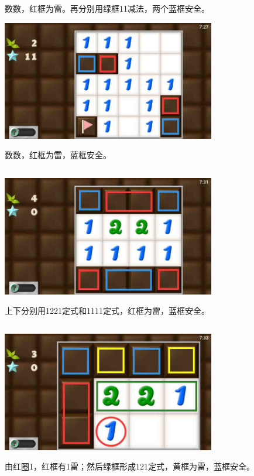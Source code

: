 数数，红框为雷。再分别用绿框11减法，两个蓝框安全。
\begin{center}
    \includegraphics[width=0.7\textwidth]{puzzlelow/5-5.jpg}
\end{center}
数数，红框为雷，蓝框安全。

\subsection{} %
\begin{center}
    \includegraphics[width=0.7\textwidth]{puzzlelow/6-1.jpg}
\end{center}
上下分别用1221定式和1111定式，红框为雷，蓝框安全。

\subsection{} %
\begin{center}
    \includegraphics[width=0.7\textwidth]{puzzlelow/7-1.jpg}
\end{center}
由红圈1，红框有1雷；然后绿框形成121定式，黄框为雷，蓝框安全。

